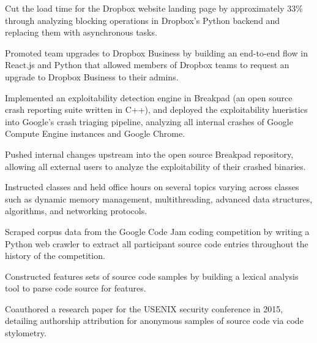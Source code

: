 \documentclass[]{template}
\begin{document}
\begin{tightemize}
\item Cut the load time for the Dropbox website landing page by approximately 33\% through analyzing blocking operations in Dropbox's Python backend and replacing them with asynchronous tasks.
\item Promoted team upgrades to Dropbox Business by building an end-to-end flow in React.js and Python that allowed members of Dropbox teams to request an upgrade to Dropbox Business to their admins.
\end{tightemize}
\sectionsep

\begin{tightemize}
\item Implemented an exploitability detection engine in Breakpad (an open source crash reporting suite written in C++), and deployed the exploitability hueristics into Google's crash triaging pipeline, analyzing all internal crashes of Google Compute Engine instances and Google Chrome.
\item Pushed internal changes upstream into the open source Breakpad repository, allowing all external users to analyze the exploitability of their crashed binaries.
\end{tightemize}
\sectionsep

\begin{tightemize}
\item Instructed classes and held office hours on several topics varying across classes such as dynamic memory management, multithreading, advanced data structures, algorithms, and networking protocols.
\end{tightemize}
\sectionsep

\begin{tightemize}
\item Scraped corpus data from the Google Code Jam coding competition by writing a Python web crawler to extract all participant source code entries throughout the history of the competition.
\item Constructed features sets of source code samples by building a lexical analysis tool to parse code source for features.
\item Coauthored a research paper for the USENIX security conference in 2015, detailing authorship attribution for anonymous samples of source code via code stylometry.
\end{tightemize}
\sectionsep
\end{document}
